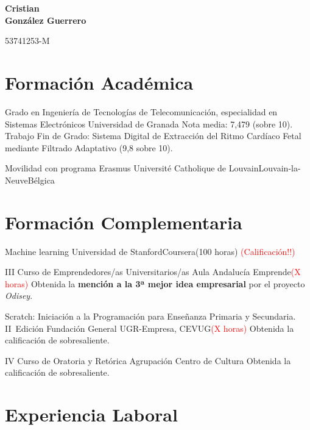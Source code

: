 \documentclass[11pt,a4paper,sans,spanish]{moderncv}
\begin{document}
\begin{minipage}[c]{\textwidth-110pt-0.5em}
    \begin{flushright}
        \textbf{\Huge{Cristian\\\vspace{4pt}González Guerrero}}

        \vspace{4pt}
        \small{53741253-M}
    \end{flushright}
\end{minipage}
\vspace{-5em}

\makecvtitle


\section{Formación Académica}

{Grado en Ingeniería de Tecnologías de Telecomunicación, especialidad en Sistemas Electrónicos}
{Universidad de Granada}{}{}
{Nota media: 7,479 (sobre 10). 
Trabajo Fin de Grado: 
Sistema Digital de Extracción del Ritmo Cardíaco Fetal mediante Filtrado Adaptativo (9,8 sobre 10).}

{Movilidad con programa Erasmus}
{Université Catholique de Louvain}{Louvain-la-Neuve}{Bélgica}{}


\section{Formación Complementaria}

{Machine learning}
{Universidad de Stanford}{Coursera}{(100 horas)}
{\textcolor{red}{(Calificación!!)}}

{III Curso de Emprendedores/as Universitarios/as}
{Aula Andalucía Emprende}{}{\textcolor{red}{(X horas)}}
{Obtenida la \textbf{mención a la 3ª mejor idea empresarial} por el proyecto \emph{Odisey}. }

{Scratch: Iniciación a la Programación para Enseñanza Primaria y Secundaria. II~Edición}
{Fundación General UGR-Empresa, CEVUG}{}{\textcolor{red}{(X horas)}}
{Obtenida la calificación de sobresaliente.}

{IV Curso de Oratoria y Retórica}
{Agrupación Centro de Cultura}{}{}
{Obtenida la calificación de sobresaliente.}


\section{Experiencia Laboral}
\end{document}
